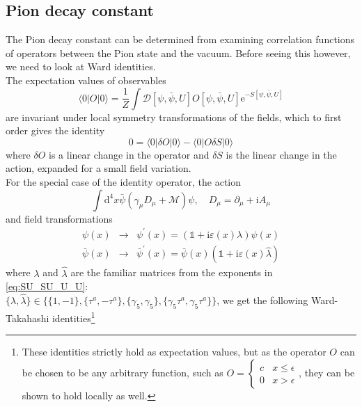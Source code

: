 \documentclass[a4paper,10pt]{book}
\begin{document}
\subsection{Pion decay constant}
The Pion decay constant can be determined from examining correlation functions of operators between the Pion state and the vacuum. Before seeing this however, we need to look at Ward identities.\\ The expectation values of observables 
\begin{equation}
\langle 0|O| 0\rangle=\frac{1}{Z} \int \mathcal{D}[\psi, \bar{\psi}, U] O[\psi, \bar{\psi}, U] \mathrm{e}^{-S[\psi, \bar{\psi}, U]}
\end{equation}
are invariant under local symmetry transformations of the fields, which to first order gives the identity
\begin{equation}
0=\langle 0|\delta O| 0\rangle-\langle 0|O \delta S| 0\rangle
\end{equation}
where $\delta O$ is a linear change in the operator and $\delta S$ is the linear change in the action, expanded for a small field variation.\\For the special case of the identity operator, the action
\begin{equation}
\int \mathrm{d}^{4} x \bar{\psi}\left(\gamma_{\mu} D_{\mu}+\mathcal{M}\right) \psi, \quad D_{\mu}=\partial_{\mu}+\mathrm{i} A_{\mu}
\end{equation}
and field transformations
\begin{equation}
\begin{array}{rlr}
\psi(x) & \rightarrow & \psi^{\prime}(x)=(\mathbb{1}+\mathrm{i} \varepsilon(x) \lambda) \psi(x) \\
\bar{\psi}(x) & \rightarrow & \bar{\psi}^{\prime}(x)=\bar{\psi}(x)(\mathbb{1}+\mathrm{i} \varepsilon(x) \hat{\lambda})
\end{array}
\end{equation}
where $\lambda$ and $\hat{\lambda}$ are the familiar matrices from the exponents in \eqref{eq:SU_SU_U_U}:\\ $\{\lambda,\hat{\lambda}\} \in \{\{1,-1 \} ,\{\tau^a,-\tau^a \}, \{\gamma_5,\gamma_5 \},\{\gamma_5\tau^a,\gamma_5\tau^a \} \}$, we get the following Ward-Takahashi identities\footnote{These identities strictly hold as expectation values, but as the operator $O$ can be chosen to be any arbitrary function, such as $O = \begin{cases} 
      c & x\leq \epsilon \\
      0 & x > \epsilon
   \end{cases}$, they can be shown to hold locally as well.}
\end{document}
